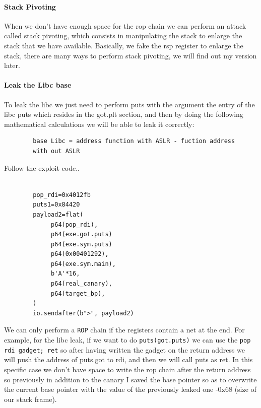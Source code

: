    \paragraph{Stack Pivoting}

    When we don't have enough space for the rop chain we can perform an attack called stack pivoting, which consists in manipulating the stack to enlarge the stack that we have available. \newline
    Basically, we fake the rsp register to enlarge the stack, there are many ways to perform stack pivoting, we will find out my version later.\newline
    \paragraph{Leak the Libc base}
    To leak the libc we just need to perform puts with the argument the entry of the libc puts which resides in the got.plt section, and then by doing the following mathematical calculations we will be able to leak it correctly:\newline
    \begin{verbatim}
        base Libc = address function with ASLR - fuction address
        with out ASLR  
    \end{verbatim}
    Follow the exploit code.\newline.
    \begin{verbatim}
                
        pop_rdi=0x4012fb
        puts1=0x84420      
        payload2=flat(
             p64(pop_rdi),
             p64(exe.got.puts)
             p64(exe.sym.puts)
             p64(0x00401292), 
             p64(exe.sym.main),
             b'A'*16,
             p64(real_canary), 
             p64(target_bp), 
        )
        io.sendafter(b">", payload2)
    \end{verbatim}
     We can only perform a \texttt{ROP} chain if the registers contain a net at the end.\newline
    For example, for the libc leak, if we want to do \texttt{puts(got.puts)} we can use the \texttt{pop rdi gadget; ret} so after having written the gadget on the return address we will push the address of puts.got to rdi, and then we will call puts as ret.\newline   
    In this specific case we don't have space to write the rop chain after the return address so previously in addition to the canary I saved the base pointer so as to overwrite the current base pointer with the value of the previously leaked one -0x68 (size of our stack frame).\newline
